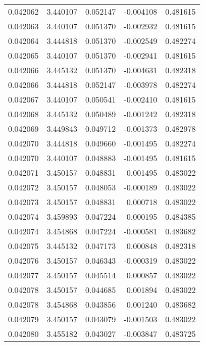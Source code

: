\begin{tabular}{lrrrr}
0.042062    &  3.440107 &  0.052147 & -0.004108 &             0.481615 \\
0.042063    &  3.440107 &  0.051370 & -0.002932 &             0.481615 \\
0.042064    &  3.444818 &  0.051370 & -0.002549 &             0.482274 \\
0.042065    &  3.440107 &  0.051370 & -0.002941 &             0.481615 \\
0.042066    &  3.445132 &  0.051370 & -0.004631 &             0.482318 \\
0.042066    &  3.444818 &  0.052147 & -0.003978 &             0.482274 \\
0.042067    &  3.440107 &  0.050541 & -0.002410 &             0.481615 \\
0.042068    &  3.445132 &  0.050489 & -0.001242 &             0.482318 \\
0.042069    &  3.449843 &  0.049712 & -0.001373 &             0.482978 \\
0.042070    &  3.444818 &  0.049660 & -0.001495 &             0.482274 \\
0.042070    &  3.440107 &  0.048883 & -0.001495 &             0.481615 \\
0.042071    &  3.450157 &  0.048831 & -0.001495 &             0.483022 \\
0.042072    &  3.450157 &  0.048053 & -0.000189 &             0.483022 \\
0.042073    &  3.450157 &  0.048831 &  0.000718 &             0.483022 \\
0.042074    &  3.459893 &  0.047224 &  0.000195 &             0.484385 \\
0.042074    &  3.454868 &  0.047224 & -0.000581 &             0.483682 \\
0.042075    &  3.445132 &  0.047173 &  0.000848 &             0.482318 \\
0.042076    &  3.450157 &  0.046343 & -0.000319 &             0.483022 \\
0.042077    &  3.450157 &  0.045514 &  0.000857 &             0.483022 \\
0.042078    &  3.450157 &  0.044685 &  0.001894 &             0.483022 \\
0.042078    &  3.454868 &  0.043856 &  0.001240 &             0.483682 \\
0.042079    &  3.450157 &  0.043079 & -0.001503 &             0.483022 \\
0.042080    &  3.455182 &  0.043027 & -0.003847 &             0.483725 \\

\end{tabular}
